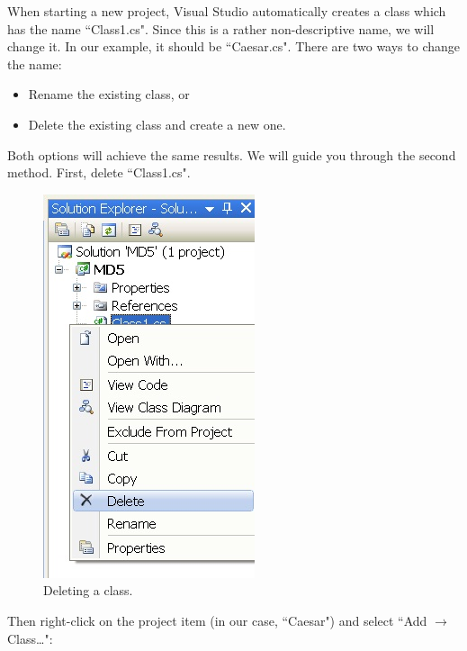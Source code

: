 When starting a new project, Visual Studio automatically creates a class which has the name ``Class1.cs".  Since this is a rather non-descriptive name, we will change it. In our example, it should be ``Caesar.cs". There are two ways to change the name:

\begin{itemize}
	\item Rename the existing class, or
	\item Delete the existing class and create a new one.
\end{itemize}

Both options will achieve the same results. We will guide you through the second method. First, delete ``Class1.cs".

\begin{figure}[h!]
	\centering
		\includegraphics{figures/new_class.jpg}
	\caption{Deleting a class.}
	\label{fig:new_class}
\end{figure}
\clearpage

Then right-click on the project item (in our case, ``Caesar") and select ``Add $\rightarrow$ Class\ldots ":

